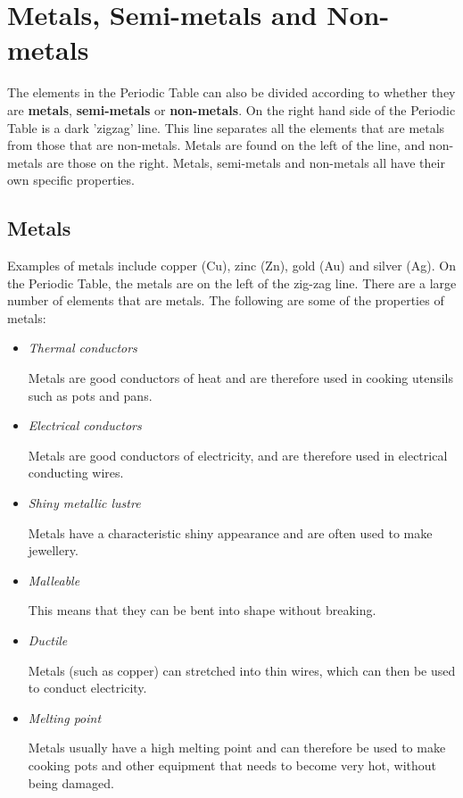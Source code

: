 



\section{Metals, Semi-metals and Non-metals}
\label{sec:cm:msm}

The elements in the Periodic Table can also be divided according to whether they are \textbf{metals}, \textbf{semi-metals} or \textbf{non-metals}. On the right hand side of the Periodic Table is a dark 'zigzag' line. This line separates all the elements that are metals from those that are non-metals. Metals are found on the left of the line, and non-metals are those on the right. Metals, semi-metals and non-metals all have their own specific properties. 

\subsection{Metals}

Examples of metals include copper (Cu), zinc (Zn), gold (Au) and silver (Ag). On the Periodic Table, the metals are on the left of the zig-zag line. There are a large number of elements that are metals. The following are some of the properties of metals:

\begin{itemize}
\item{\textit{Thermal conductors}

Metals are good conductors of heat and are therefore used in cooking utensils such as pots and pans.}

\item{\textit{Electrical conductors}

Metals are good conductors of electricity, and are therefore used in electrical conducting wires.}

\item{\textit{Shiny metallic lustre}

Metals have a characteristic shiny appearance and are often used to make jewellery.}

\item{\textit{Malleable}

This means that they can be bent into shape without breaking.}

\item{\textit{Ductile}

Metals (such as copper) can stretched into thin wires, which can then be used to conduct electricity.}

\item{\textit{Melting point}

Metals usually have a high melting point and can therefore be used to make cooking pots and other equipment that needs to become very hot, without being damaged.}

\end{itemize} 


